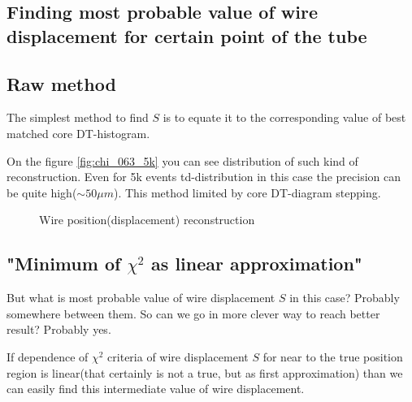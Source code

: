 	\subsection{Finding most probable value of wire displacement for certain point of the tube}
	
	\subsection{Raw method}
	The simplest method to find $S$ is to equate it to the corresponding value of best matched core DT-histogram.
	
	On the figure \ref{fig:chi_063_5k}  you can see distribution of such kind of reconstruction. Even for 5k events td-distribution in this case the precision can be quite high($\sim 50 \mu m$). This method limited by core DT-diagram stepping.
	
	\begin{figure}[h!]
		\centering
		\qquad
		\caption{Wire position(displacement) reconstruction}			
	\end{figure}	
	
	

	\subsection{"Minimum of $\chi^2$ as linear approximation"}
	But what is most probable value of wire displacement $S$ in this case? Probably somewhere between them. So can we go in more clever way to reach better result? Probably yes.
	
	If dependence of $\chi^2$ criteria of wire displacement $S$ for near to the true position region is linear(that certainly is not a true, but as first approximation) than we can easily find this intermediate value of wire displacement.
	
